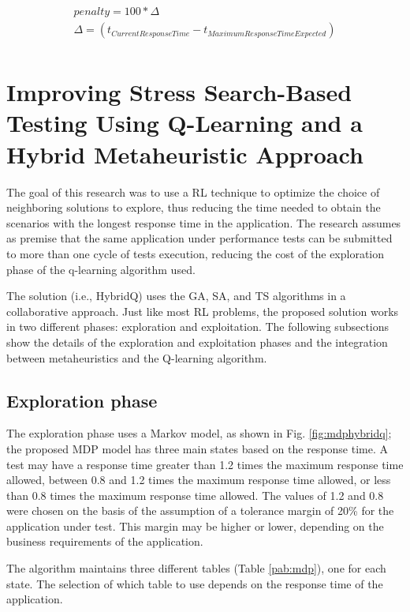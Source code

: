 \documentclass{bmcart}
\begin{document}
\begin{equation}
\begin{aligned}
penalty=100 * \Delta \\
\Delta=(t_{Current Response Time} - t_{Maximum Response Time Expected})\\
\end{aligned}
\end{equation}



\section{Improving Stress Search-Based Testing Using Q-Learning and a Hybrid Metaheuristic Approach}


The goal of this research was to use a RL technique to optimize the choice of neighboring solutions to explore, thus reducing the time needed to obtain the scenarios with the longest response time in the application. The research assumes as premise that the same application under performance tests can be submitted to more than one cycle of tests execution, reducing the cost of the exploration phase of the q-learning algorithm used. 

The solution (i.e., HybridQ) uses the GA, SA, and TS algorithms in a collaborative approach. Just like most RL problems, the proposed solution works in two different phases: exploration and exploitation. The following subsections show the details of the exploration and exploitation phases and the integration between metaheuristics and the Q-learning algorithm.


\subsection{Exploration phase}

The exploration phase uses a Markov model, as shown in Fig. \ref{fig:mdphybridq}; the proposed MDP model has three main states based on the response time. A test may have a response time greater than 1.2 times the maximum response time allowed, between 0.8 and 1.2 times the maximum response time allowed, or less than 0.8 times the maximum response time allowed. The values of 1.2 and 0.8 were chosen on the basis of the assumption of a tolerance margin of 20\% for the application under test. This margin may be higher or lower, depending on the business requirements of the application.

The algorithm maintains three different tables (Table \ref{pab:mdp}), one for each state. The selection of which table to use depends on the response time of the application.
\end{document}
